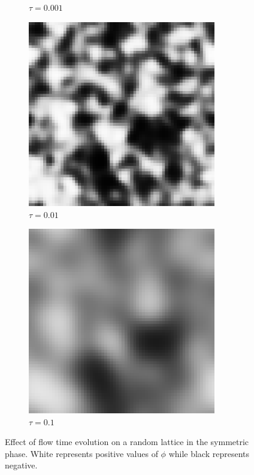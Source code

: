 \documentclass[12pt]{report}
\begin{document}
\begin{figure}[h]
\begin{subfigure}[b]{0.2\textwidth}
        \caption{$\tau=0.001$}
      \end{subfigure}%
      \begin{subfigure}[b]{0.2\textwidth}\centering
        \includegraphics[width=0.9\textwidth]{imgs/gf2.png}
        \caption{$\tau=0.01$}
      \end{subfigure}%
      \begin{subfigure}[b]{0.2\textwidth}\centering
        \includegraphics[width=0.9\textwidth]{imgs/gf3.png}
        \caption{$\tau=0.1$}
      \end{subfigure}%
      \caption{\label{fig:flow} Effect of flow time evolution on a random lattice in the symmetric phase. White represents positive values of $\phi$ while black represents negative.}
\end{figure}
\end{document}
